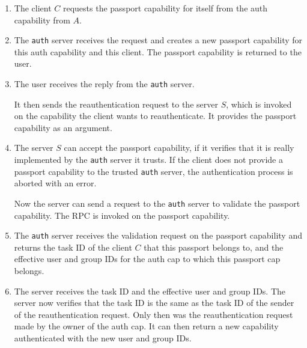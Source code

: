 \begin{enumerate}
\item The client $C$ requests the passport capability for itself from
  the auth capability from $A$.

  \begin{comment}
    Normally, the client will request the passport capability only
    once and store it together with the auth capability.
  \end{comment}
  
\item The \texttt{auth} server receives the request and creates a new
  passport capability for this auth capability and this client.  The
  passport capability is returned to the user.
  
\item The user receives the reply from the \texttt{auth} server.
  
  It then sends the reauthentication request to the server $S$, which
  is invoked on the capability the client wants to reauthenticate.  It
  provides the passport capability as an argument.
  
\item The server $S$ can accept the passport capability, if it
  verifies that it is really implemented by the \texttt{auth} server
  it trusts.  If the client does not provide a passport capability to
  the trusted \texttt{auth} server, the authentication process is
  aborted with an error.
  
  Now the server can send a request to the \texttt{auth} server to
  validate the passport capability.  The RPC is invoked on the
  passport capability.
  
\item The \texttt{auth} server receives the validation request on the
  passport capability and returns the task ID of the client $C$ that
  this passport belongs to, and the effective user and group IDs for
  the auth cap to which this passport cap belongs.

  \begin{comment}
    The Hurd on Mach returned the available IDs as well.  This feature
    is not used anywhere in the Hurd, and as the available IDs should
    not be used for authentication anyway, this does not seem to be
    useful.  If it is needed, it can be added in an extended version
    of the validation RPC.
  \end{comment}
  
\item The server receives the task ID and the effective user and group
  IDs.  The server now verifies that the task ID is the same as the
  task ID of the sender of the reauthentication request.  Only then
  was the reauthentication request made by the owner of the auth cap.
  It can then return a new capability authenticated with the new user
  and group IDs.


\end{enumerate}

